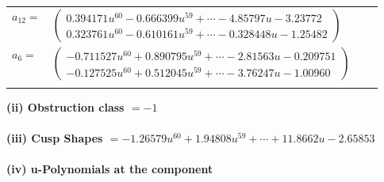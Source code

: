 \documentclass[1p]{elsarticle_modified}
\theoremstyle{definition}
\begin{document}
\begin{tabular}{m{7pt} m{180pt} m{7pt} m{180pt} }
\flushright $a_{12}=$&$\begin{pmatrix}0.394171 u^{60}-0.666399 u^{59}+\cdots-4.85797 u-3.23772\\0.323761 u^{60}-0.610161 u^{59}+\cdots-0.328448 u-1.25482\end{pmatrix}$ \\
\flushright $a_{6}=$&$\begin{pmatrix}-0.711527 u^{60}+0.890795 u^{59}+\cdots-2.81563 u-0.209751\\-0.127525 u^{60}+0.512045 u^{59}+\cdots-3.76247 u-1.00960\end{pmatrix}$\\&\end{tabular}
\flushleft \textbf{(ii) Obstruction class $= -1$}\\~\\
\flushleft \textbf{(iii) Cusp Shapes $= -1.26579 u^{60}+1.94808 u^{59}+\cdots+11.8662 u-2.65853$}\\~\\
\newpage\renewcommand{\arraystretch}{1}
\flushleft \textbf{(iv) u-Polynomials at the component}\newline \\
\end{document}
